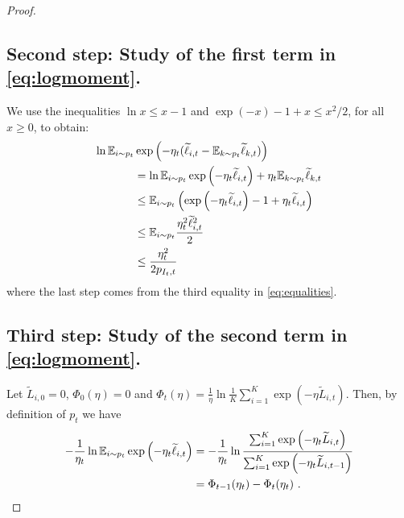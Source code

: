 \documentclass[11pt]{hackednow}
\newcommand{\E}{\mathbb{E}}
\renewcommand{\tilde}{\widetilde}
\begin{document}
\begin{proof}
\subsection*{Second step: Study of the first term in \eqref{eq:logmoment}.}
We use the inequalities $\ln x \leq x-1$ and $\exp(-x) - 1 + x \leq x^2/2$, for all $x \geq 0$, to obtain:
\begin{align}
\ln \E_{i \sim p_t} &\exp{\left(- \eta_t (\tilde{\ell}_{i,t} - \E_{k \sim p_t} \tilde{\ell}_{k,t}) \right)} \notag \\
& =  \ln \E_{i \sim p_t} \exp{\left(- \eta_t \tilde{\ell}_{i,t}\right)} + \eta_t \E_{k \sim p_t} \tilde{\ell}_{k,t} \notag \\
&\leq \E_{i \sim p_t} \left(\exp{\left(- \eta_t \tilde{\ell}_{i,t}\right)} - 1 + \eta_t \tilde{\ell}_{i,t} \right) \notag \\
&\leq \E_{i \sim p_t} \frac{\eta_t^2 \tilde{\ell}_{i,t}^2}{2} \notag \\
&\leq \frac{\eta_t^2}{2 p_{I_t,t}} \label{eq:secondstep}
\end{align}
where the last step comes from the third equality in \eqref{eq:equalities}.

\subsection*{Third step: Study of the second term in \eqref{eq:logmoment}.}
Let $\tilde{L}_{i,0}=0$, $\Phi_0(\eta)=0$ and $\Phi_t(\eta) = \frac{1}{\eta} \ln \frac{1}{K} \sum_{i=1}^K \exp{\left(- \eta \tilde{L}_{i,t}\right)}$. Then, by definition of $p_t$ we have
\begin{align}
- \frac{1}{\eta_t} \ln \E_{i \sim p_t} \exp{\left(- \eta_t \tilde{\ell}_{i,t} \right)} 
& = - \frac{1}{\eta_t} \ln \frac{\sum_{i=1}^K \exp{\left(- \eta_t \tilde{L}_{i,t}\right)}}{\sum_{i=1}^K \exp{\left(- \eta_t \tilde{L}_{i,t-1}\right)}} \notag \\
& = \Phi_{t-1}(\eta_t) - \Phi_{t}(\eta_t)~. \label{eq:thirdstep}
\end{align}


\end{proof}
\end{document}
